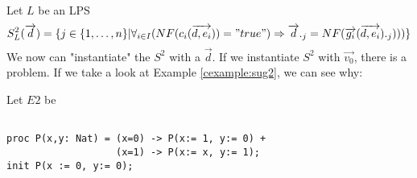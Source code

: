 \index{}\documentclass[a4paper,10pt]{article}
\theoremstyle{plain}
\theoremstyle{definition}
\newcommand{\ovr}{\overrightarrow}
\begin{document}
\begin{defn}\label{def:sug2}  Let $L$ be an LPS
\begin{displaymath}
S_L^2(\ovr{d})=
\lbrace   
j \in \lbrace 1, \ldots , n \rbrace \vert \forall_{i\in I} (NF(c_i(\ovr{d,e_i})) = "true") \Rightarrow \ovr{d}._j = NF(\ovr{g_i}(\ovr{d,e_i})._j)))\rbrace
\end{displaymath}
We now can "instantiate" the $S^2$ with a $\ovr{d}$. If we instantiate $S^2$ with $\ovr{v_0}$, there is a problem. If we take a look at Example \ref{cexample:sug2}, we can see why:

\begin{example} Let $E2$ be\label{cexample:sug2}\begin{verbatim} 
 
proc P(x,y: Nat) = (x=0) -> P(x:= 1, y:= 0) +
                   (x=1) -> P(x:= x, y:= 1);
init P(x := 0, y:= 0);


\end{verbatim}
\end{example}
\end{defn}
\end{document}
